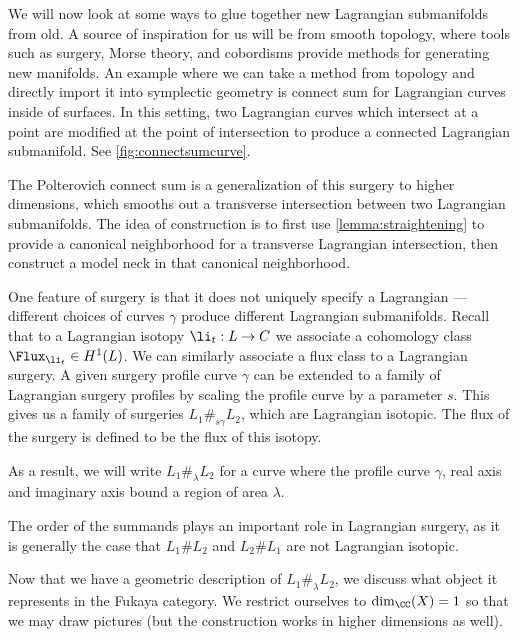 
We will now look at some ways to glue together new Lagrangian submanifolds from old.
A source of inspiration for us will be from smooth topology, where tools such as surgery, Morse theory, and cobordisms provide methods for generating new manifolds.
An example where we can take a method from topology and directly import it into symplectic geometry is connect sum for Lagrangian curves inside of surfaces.
In this setting, two Lagrangian curves which intersect at a point are modified at the point of intersection to produce a connected Lagrangian submanifold.
See \cref{fig:connectsumcurve}.

The Polterovich connect sum is a generalization of this surgery to higher dimensions, which smooths out a transverse intersection between two Lagrangian submanifolds. 
The idea of construction is to first use \cref{lemma:straightening} to provide a canonical neighborhood for a transverse Lagrangian intersection, then construct a model neck in that canonical neighborhood. 



One feature of surgery is that it does not uniquely specify a Lagrangian --- different choices of curves $\gamma$ produce different Lagrangian submanifolds.
Recall that to a Lagrangian isotopy $\li_t: L\to C$ we associate a cohomology class $\Flux_{\li_t}\in H^1(L)$. 
We can similarly associate a flux class to a Lagrangian surgery.
A given surgery profile curve $\gamma$ can be extended to a family of Lagrangian surgery profiles by scaling the profile curve by a parameter $s$.  
This gives us a family of surgeries $L_1\#_{s\gamma} L_2$, which are Lagrangian isotopic.
The flux of the surgery is defined to be the flux of this isotopy. 

As a result, we will write $L_1\#_{\lambda}L_2$ for a curve where the profile curve $\gamma$, real axis and imaginary axis bound a region of area $\lambda$. 

The order of the summands plays an important role in Lagrangian surgery, as it is generally the case that $L_1\#L_2$ and $L_2\#L_1$ are not Lagrangian isotopic. 




Now that we have a geometric description of $L_1\#_\lambda L_2$, we discuss what object it represents in the Fukaya category. We restrict ourselves to $\dim_\CC(X)=1$ so that we may draw pictures (but the construction works in higher dimensions as well).

